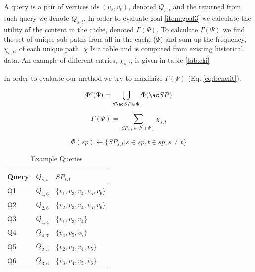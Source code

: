 A query is a pair of vertices ids $(v_s, v_t)$, denoted $Q_{s,t}$ and the \spath returned from such query we denote $Q_{s,t}$. 
In order to evaluate goal \ref{item:goal3} we calculate the utility of the content in the cache, denoted $\Gamma(\Psi)$. To calculate $\Gamma(\Psi)$ we find the set of unique sub-paths from all \spaths in the cache ($\Psi$) and sum up the frequency, $\chi_{s,t}$, of each unique path.
$\chi$ Is a table and is computed from existing historical data. An example of different entries, $\chi_{s,t}$, is given in table \ref{tab:chi}

In order to evaluate our method we try to maximize $\Gamma(\Psi)$ (Eq. \ref{eq:benefit}).



\begin{equation} \label{eq:upsi}
 \Phi^c(\Psi) = \bigcup\limits_{\forall \spath \in \Psi} \Phi(\spath)
\end{equation}

\begin{equation} \label{eq:benefit}
\Gamma(\Psi) = \sum\limits_{SP_{s,t} \in \Phi^c(\Psi)} \chi_{s,t}
\end{equation}

\begin{equation} \label{eq:phi}
\Phi(sp) \leftarrow \{ SP_{s,t} | s \in sp, t \in sp, s \neq t\}
\end{equation}

\begin{table}
\center
\begin{tabular}{|l|l|l|}\hline
Query	&	$Q_{s,t}$	& $SP_{s,t}$ \\\hline 
Q1	&	$Q_{1,6}$ 	& $\{v_1,v_3,v_4,v_5,v_6\}$\\
Q2	&	$Q_{2,6}$ 	& $\{v_2,v_3,v_4,v_5,v_6\}$ \\
Q3	&	$Q_{1,4}$ 	& $\{v_1,v_3,v_4\}$ \\
Q4	&	$Q_{4,7}$ 	& $\{v_4,v_5,v_7\}$ \\
Q5	&	$Q_{2,5}$ 	& $\{v_2,v_3,v_4,v_5\}$ \\
Q6	&	$Q_{3,6}$ 	& $\{v_3,v_4,v_5,v_6\}$ \\\hline
\end{tabular}
\caption{Example Queries}
\label{tab:queries}
\end{table}





